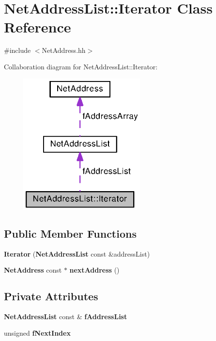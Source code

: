 \section{Net\+Address\+List\+:\+:Iterator Class Reference}
\label{classNetAddressList_1_1Iterator}


{\ttfamily \#include $<$Net\+Address.\+hh$>$}



Collaboration diagram for Net\+Address\+List\+:\+:Iterator\+:
\nopagebreak
\begin{figure}[H]
\begin{center}
\leavevmode
\includegraphics[width=181pt]{classNetAddressList_1_1Iterator__coll__graph}
\end{center}
\end{figure}
\subsection*{Public Member Functions}
\begin{DoxyCompactItemize}
\item 
{\bf Iterator} ({\bf Net\+Address\+List} const \&address\+List)
\item 
{\bf Net\+Address} const $\ast$ {\bf next\+Address} ()
\end{DoxyCompactItemize}
\subsection*{Private Attributes}
\begin{DoxyCompactItemize}
\item 
{\bf Net\+Address\+List} const \& {\bf f\+Address\+List}
\item 
unsigned {\bf f\+Next\+Index}
\end{DoxyCompactItemize}


